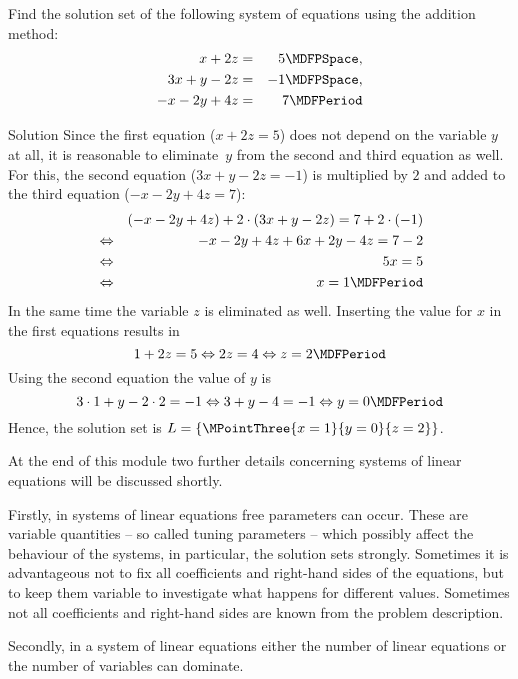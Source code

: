 \begin{MExercises}
\begin{MExercise}
Find the solution set of the following system of equations using the addition method:
\begin{eqnarray*}
x + 2 z & = & 5 \MDFPSpace, \\ 3 x + y - 2 z & = & - 1  \MDFPSpace,\\ - x - 2 y + 4 z & = & 7 \MDFPeriod
\end{eqnarray*}

\begin{MHint}{Solution}
Since the first equation ($x + 2 z = 5$) does not depend on the variable $y$ at all, it is reasonable
to eliminate~$y$ from the second and third equation as well. For this, the second equation
($3 x + y - 2 z = - 1$) is multiplied by $2$ and added to the third equation ($- x - 2 y + 4 z = 7$):
\begin{eqnarray*}
& & (- x - 2 y + 4 z) + 2 \cdot (3 x + y - 2 z) = 7 + 2 \cdot (- 1) \\
& \Leftrightarrow & - x - 2 y + 4 z + 6 x + 2 y - 4 z = 7 - 2 \\
& \Leftrightarrow & 5 x = 5 \\
& \Leftrightarrow & x = 1 \MDFPeriod
\end{eqnarray*}
In the same time the variable $z$ is eliminated as well. Inserting
the value for $x$ in the first equations results in
$$1 + 2 z = 5 \Leftrightarrow 2 z = 4 \Leftrightarrow z = 2 \MDFPeriod$$
Using the second equation the value of $y$ is
$$3 \cdot 1 + y - 2 \cdot 2 = - 1 \Leftrightarrow 3 + y - 4 = - 1 \Leftrightarrow y = 0 \MDFPeriod$$
Hence, the solution set is ${\ML} = \{ \MPointThree{x = 1}{y = 0}{z = 2} \}$.
\end{MHint}
\end{MExercise}
\end{MExercises}




\begin{MIntro}

At the end of this module two further details concerning systems of linear equations
will be discussed shortly.

Firstly, in systems of linear equations free parameters can occur. These are variable 
quantities -- so called tuning parameters -- which possibly affect the behaviour of the systems, in
particular, the solution sets strongly. Sometimes it is advantageous not to fix all coefficients
and right-hand sides of the equations, but to keep them variable to investigate what happens for 
different values. Sometimes not all coefficients and right-hand sides are known from the 
problem description. 

Secondly, in a system of linear equations either the number of linear equations or the number of 
variables can dominate.

\end{MIntro}

